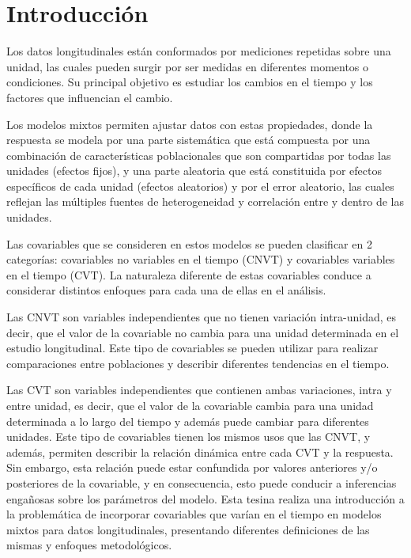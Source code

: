 \documentclass[spanish]{article}
\numberwithin{figure}{subsection}
\numberwithin{equation}{subsection}
\numberwithin{table}{subsection}
\begin{document}
\newpage
\tableofcontents

\newpage
\section{Introducción}

Los datos longitudinales están conformados por mediciones repetidas sobre una
unidad, las cuales pueden surgir por ser medidas en diferentes momentos o
condiciones. Su principal objetivo es estudiar los cambios en el tiempo y los
factores que influencian el cambio. 

Los modelos mixtos permiten ajustar datos con estas propiedades, donde la
respuesta se modela por una parte sistemática que está compuesta por una
combinación de características poblacionales que son compartidas por todas las
unidades (efectos fijos), y una parte aleatoria que está constituida por efectos
específicos de cada unidad (efectos aleatorios) y por el error aleatorio, las
cuales reflejan las múltiples fuentes de heterogeneidad y correlación entre y
dentro de las unidades.

Las covariables que se consideren en estos modelos se pueden clasificar en 2
categorías: covariables no variables en el tiempo (CNVT) y covariables variables
en el tiempo (CVT). La naturaleza diferente de estas covariables conduce a
considerar distintos enfoques para cada una de ellas en el análisis.

Las CNVT son variables independientes que no tienen variación intra-unidad, es
decir, que el valor de la covariable no cambia para una unidad determinada en
el estudio longitudinal. Este tipo de covariables se pueden utilizar para
realizar comparaciones entre poblaciones y describir diferentes tendencias en el
tiempo.

Las CVT son variables independientes que contienen ambas variaciones, intra y
entre unidad, es decir, que el valor de la covariable cambia para una unidad
determinada a lo largo del tiempo y además puede cambiar para diferentes
unidades. Este tipo de covariables tienen los mismos usos que las CNVT, y
además, permiten describir la relación dinámica entre cada CVT y la respuesta.
Sin embargo, esta relación puede estar confundida por valores anteriores y/o
posteriores de la covariable, y en consecuencia, esto puede conducir a
inferencias engañosas sobre los parámetros del modelo. Esta tesina realiza una
introducción a la problemática de incorporar covariables que varían en el tiempo
en modelos mixtos para datos longitudinales, presentando diferentes definiciones
de las mismas y enfoques metodológicos.
\end{document}
